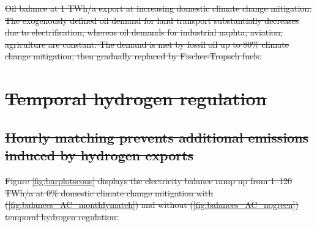 \documentclass[5p,numafflabel]{elsarticle}
\def\runstandard{decr_13_3H_ws} %
\providecommand{\DIFdeltex}[1]{{\protect\color{red}\sout{#1}}}                      %
\providecommand{\DIFdelFL}[1]{\DIFdel{#1}} %
\providecommand{\DIFdel}[1]{\texorpdfstring{\DIFdeltex{#1}}{}} %
\begin{document}
{%
\DIFdelFL{Oil balance at 1 TWh/a export at increasing domestic climate change mitigation. The exogenously defined oil demand for land transport substantially decreases due to electrification, whereas oil demands for industrial naphta, aviation, agriculture are constant. The demand is met by fossil oil up to 80\% climate change mitigation, then gradually replaced by Fischer-Tropsch fuels.}}


\section{\DIFdel{Temporal hydrogen regulation}}
\addtocounter{section}{-1}%

\subsection{\DIFdel{Hourly matching prevents additional emissions induced by hydrogen exports}}
\addtocounter{subsection}{-1}%
\DIFdel{Figure \ref{fig:barplotscons} displays the electricity balance ramp up from 1--120 TWh/a at 0\% domestic climate change mitigation with (\ref{fig:balances_AC_monthlymatch}) and without (\ref{fig:balances_AC_nogreen}) temporal hydrogen regulation.
}%
\end{document}
